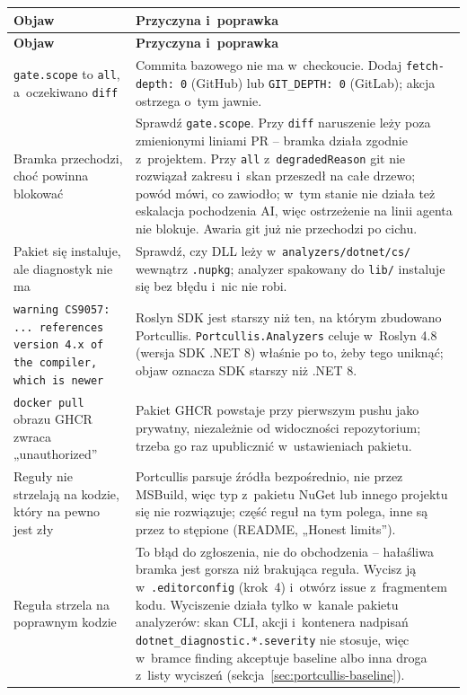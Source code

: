 \begingroup\small
\begin{xltabular}{\linewidth}{@{}>{\raggedright\arraybackslash}p{4.6cm} >{\raggedright\arraybackslash}X@{}}
\toprule
\textbf{Objaw} & \textbf{Przyczyna i~poprawka} \\
\midrule
\endfirsthead
\toprule
\textbf{Objaw} & \textbf{Przyczyna i~poprawka} \\
\midrule
\endhead
\texttt{gate.scope} to \texttt{all}, a~oczekiwano \texttt{diff} & Commita bazowego nie ma w~checkoucie. Dodaj \texttt{fetch-depth: 0} (GitHub) lub \texttt{GIT\_DEPTH: 0} (GitLab); akcja ostrzega o~tym jawnie. \\
Bramka przechodzi, choć powinna blokować & Sprawdź \texttt{gate.scope}. Przy \texttt{diff} naruszenie leży poza zmienionymi liniami PR -- bramka działa zgodnie z~projektem. Przy \texttt{all} z~\texttt{degradedReason} git nie rozwiązał zakresu i~skan przeszedł na całe drzewo; powód mówi, co zawiodło; w~tym stanie nie działa też eskalacja pochodzenia AI, więc ostrzeżenie na linii agenta nie blokuje. Awaria git już nie przechodzi po cichu. \\
Pakiet się instaluje, ale diagnostyk nie ma & Sprawdź, czy DLL leży w~\texttt{analyzers/dotnet/cs/} wewnątrz \texttt{.nupkg}; analyzer spakowany do \texttt{lib/} instaluje się bez błędu i~nic nie robi. \\
\texttt{warning CS9057: ... references version 4.x of the compiler, which is newer} & Roslyn SDK jest starszy niż ten, na którym zbudowano Portcullis. \texttt{Portcullis.Analyzers} celuje w~Roslyn 4.8 (wersja SDK .NET 8) właśnie po to, żeby tego uniknąć; objaw oznacza SDK starszy niż .NET 8. \\
\texttt{docker pull} obrazu GHCR zwraca „unauthorized” & Pakiet GHCR powstaje przy pierwszym pushu jako prywatny, niezależnie od widoczności repozytorium; trzeba go raz upublicznić w~ustawieniach pakietu. \\
Reguły nie strzelają na kodzie, który na pewno jest zły & Portcullis parsuje źródła bezpośrednio, nie przez MSBuild, więc typ z~pakietu NuGet lub innego projektu się nie rozwiązuje; część reguł na tym polega, inne są przez to stępione (README, „Honest limits”). \\
Reguła strzela na poprawnym kodzie & To błąd do zgłoszenia, nie do obchodzenia -- hałaśliwa bramka jest gorsza niż brakująca reguła. Wycisz ją w~\texttt{.editorconfig} (krok~4) i~otwórz issue z~fragmentem kodu. Wyciszenie działa tylko w~kanale pakietu analyzerów: skan CLI, akcji i~kontenera nadpisań \texttt{dotnet\_diagnostic.*.severity} nie stosuje, więc w~bramce finding akceptuje baseline albo inna droga z~listy wyciszeń (sekcja~\ref{sec:portcullis-baseline}). \\

\end{xltabular}
